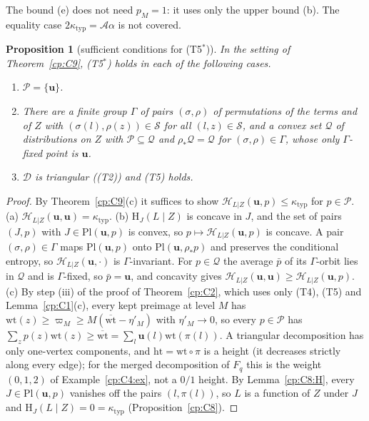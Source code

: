 \documentclass[11pt]{article}
\newtheorem{proposition}[theorem]{Proposition}
\theoremstyle{definition}
\theoremstyle{remark}
\newcommand{\Ent}{\mathrm{H}}                 %
\newcommand{\Tcond}[1]{\textup{(T#1)}}        %
\newcommand{\Acs}{\mathcal A}                %
\newcommand{\ktyp}{\kappa_{\mathrm{typ}}}    %
\newcommand{\Sr}{\mathcal S}                 %
\newcommand{\Pl}{\mathrm{Pl}}                %
\newcommand{\Hlz}{\mathcal H_{L|Z}}          %
\newcommand{\unif}{\mathbf u}                %
\newcommand{\wt}{\mathrm{wt}}                %
\newcommand{\wbar}{\overline{\mathrm{wt}}}
\newcommand{\hgt}{\mathrm{ht}}               %
\begin{document}
The bound (e) does not need $p_M=1$: it uses only the upper bound (b). The equality case $2\ktyp=\Acs\alpha$ is not covered.

\begin{proposition}[sufficient conditions for \Tcond{5$^*$}]\label{cp:C10}
In the setting of Theorem~\ref{cp:C9}, \Tcond{5$^*$} holds in each of the following cases.
\begin{enumerate}[label=(\alph*)]
\item $\mathcal P=\{\unif\}$.
\item There are a finite group $\Gamma$ of pairs $(\sigma,\rho)$ of permutations of the terms and of $Z$ with $(\sigma(l),\rho(z))\in\Sr$ for all $(l,z)\in\Sr$, and a convex set $\mathcal Q$ of distributions on $Z$ with $\mathcal P\subseteq\mathcal Q$ and $\rho_*\mathcal Q=\mathcal Q$ for $(\sigma,\rho)\in\Gamma$, whose only $\Gamma$-fixed point is $\unif$.
\item $\mathcal D$ is triangular (\Tcond2) and \Tcond5{} holds.
\end{enumerate}
\end{proposition}

\begin{proof}
By Theorem~\ref{cp:C9}(c) it suffices to show $\Hlz(\unif,p)\le\ktyp$ for $p\in\mathcal P$. (a) $\Hlz(\unif,\unif)=\ktyp$. (b) $\Ent_J(L\mid Z)$ is concave in $J$, and the set of pairs $(J,p)$ with $J\in\Pl(\unif,p)$ is convex, so $p\mapsto\Hlz(\unif,p)$ is concave. A pair $(\sigma,\rho)\in\Gamma$ maps $\Pl(\unif,p)$ onto $\Pl(\unif,\rho_*p)$ and preserves the conditional entropy, so $\Hlz(\unif,\cdot)$ is $\Gamma$-invariant. For $p\in\mathcal Q$ the average $\bar p$ of its $\Gamma$-orbit lies in $\mathcal Q$ and is $\Gamma$-fixed, so $\bar p=\unif$, and concavity gives $\Hlz(\unif,\unif)\ge\Hlz(\unif,p)$. (c) By step (iii) of the proof of Theorem~\ref{cp:C2}, which uses only \Tcond4, \Tcond5{} and Lemma~\ref{cp:C1}(c), every kept preimage at level $M$ has $\wt(z)\ge\varpi_M\ge M(\wbar-\eta'_M)$ with $\eta'_M\to0$, so every $p\in\mathcal P$ has $\sum_zp(z)\wt(z)\ge\wbar=\sum_l\unif(l)\wt(\pi(l))$. A triangular decomposition has only one-vertex components, and $\hgt=\wt\circ\pi$ is a height (it decreases strictly along every edge); for the merged decomposition of $F_q$ this is the weight $(0,1,2)$ of Example~\ref{cp:C4:ex}, not a $0/1$ height. By Lemma~\ref{cp:C8:H}, every $J\in\Pl(\unif,p)$ vanishes off the pairs $(l,\pi(l))$, so $L$ is a function of $Z$ under $J$ and $\Ent_J(L\mid Z)=0=\ktyp$ (Proposition~\ref{cp:C8}).
\end{proof}
\end{document}
